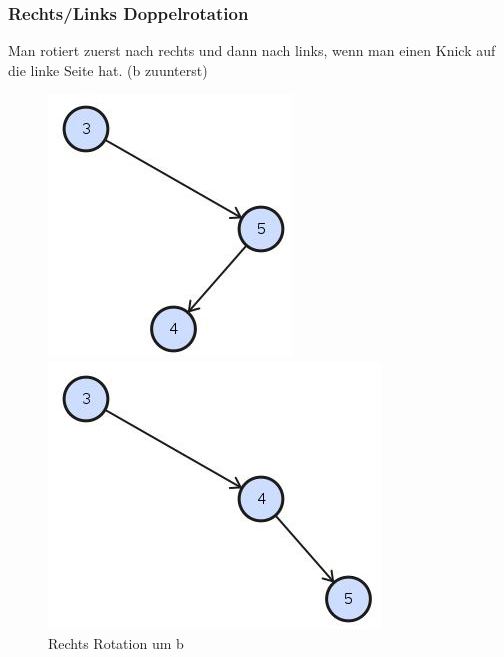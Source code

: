 \clearpage

\subsubsection{Rechts/Links Doppelrotation}
Man rotiert zuerst nach rechts und dann nach links, wenn man einen Knick auf die linke Seite hat. (b zuunterst)
\begin{figure}[h!]
	\centering
	\begin{minipage}[t]{0.4\textwidth}
		\centering
		\includegraphics[width=0.7\linewidth]{images/avl_rightleft_rotation_1}
		\caption{Rechts Rotation um b}
		\label{fig:trieexample}
	\end{minipage}
	\begin{minipage}[t]{0.4\textwidth}
		\centering
		\includegraphics[width=0.9\linewidth]{images/avl_left_rotation_1}

\end{minipage}
\end{figure}
